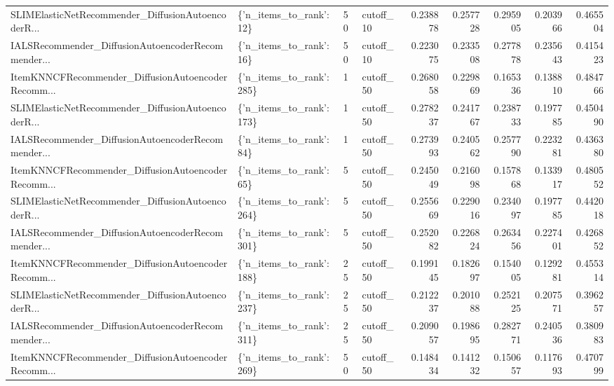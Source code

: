 \begin{tabular}{llllrrrrr}
SLIMElasticNetRecommender\_DiffusionAutoencoderR... &  \{'n\_items\_to\_rank': 12\} &       50 & cutoff\_10 & 0.238878 &   0.257728 &       0.295905 &           0.203966 &            0.465504 \\
IALSRecommender\_DiffusionAutoencoderRecommender... &  \{'n\_items\_to\_rank': 16\} &       50 & cutoff\_10 & 0.223075 &   0.233508 &       0.277878 &           0.235643 &            0.415423 \\
ItemKNNCFRecommender\_DiffusionAutoencoderRecomm... & \{'n\_items\_to\_rank': 285\} &        1 & cutoff\_50 & 0.268058 &   0.229869 &       0.165336 &           0.138810 &            0.484766 \\
SLIMElasticNetRecommender\_DiffusionAutoencoderR... & \{'n\_items\_to\_rank': 173\} &        1 & cutoff\_50 & 0.278237 &   0.241767 &       0.238733 &           0.197785 &            0.450490 \\
IALSRecommender\_DiffusionAutoencoderRecommender... &  \{'n\_items\_to\_rank': 84\} &        1 & cutoff\_50 & 0.273993 &   0.240562 &       0.257790 &           0.223281 &            0.436380 \\
ItemKNNCFRecommender\_DiffusionAutoencoderRecomm... &  \{'n\_items\_to\_rank': 65\} &        5 & cutoff\_50 & 0.245049 &   0.216098 &       0.157868 &           0.133917 &            0.480552 \\
SLIMElasticNetRecommender\_DiffusionAutoencoderR... & \{'n\_items\_to\_rank': 264\} &        5 & cutoff\_50 & 0.255669 &   0.229016 &       0.234097 &           0.197785 &            0.442018 \\
IALSRecommender\_DiffusionAutoencoderRecommender... & \{'n\_items\_to\_rank': 301\} &        5 & cutoff\_50 & 0.252082 &   0.226824 &       0.263456 &           0.227401 &            0.426852 \\
ItemKNNCFRecommender\_DiffusionAutoencoderRecomm... & \{'n\_items\_to\_rank': 188\} &       25 & cutoff\_50 & 0.199145 &   0.182697 &       0.154005 &           0.129281 &            0.455314 \\
SLIMElasticNetRecommender\_DiffusionAutoencoderR... & \{'n\_items\_to\_rank': 237\} &       25 & cutoff\_50 & 0.212237 &   0.201088 &       0.252125 &           0.207571 &            0.396257 \\
IALSRecommender\_DiffusionAutoencoderRecommender... & \{'n\_items\_to\_rank': 311\} &       25 & cutoff\_50 & 0.209057 &   0.198695 &       0.282771 &           0.240536 &            0.380983 \\
ItemKNNCFRecommender\_DiffusionAutoencoderRecomm... & \{'n\_items\_to\_rank': 269\} &       50 & cutoff\_50 & 0.148434 &   0.141232 &       0.150657 &           0.117693 &            0.470799 \\

\end{tabular}
